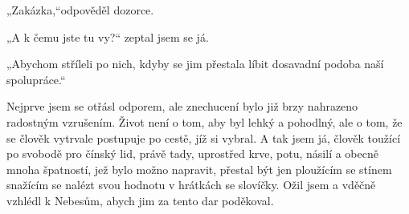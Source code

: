  „Zakázka,“odpověděl dozorce.

 „A k čemu jste tu vy?“ zeptal jsem se já.

 „Abychom stříleli po nich, kdyby se jim přestala líbit dosavadní podoba naší spolupráce.“

 Nejprve jsem se otřásl odporem, ale znechucení bylo již brzy nahrazeno radostným vzrušením. Život není o tom, aby byl lehký a pohodlný, ale o tom, že se člověk vytrvale postupuje po cestě, jíž si vybral. A tak jsem já, člověk toužící po svobodě pro čínský lid, právě tady, uprostřed krve, potu, násilí a obecně mnoha špatností, jež bylo možno napravit, přestal být jen ploužícím se stínem snažícím se nalézt svou hodnotu v hrátkách se slovíčky.  Ožil jsem a vděčně vzhlédl k Nebesům, abych jim za tento dar poděkoval. 

